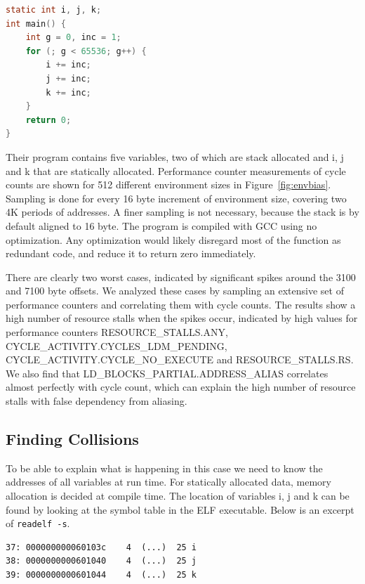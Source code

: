 \documentclass[a4paper,10pt,twocolumn,twoside]{article}
\begin{document}
\begin{lstlisting}[float=h, language=C, caption={Microkernel succeptible to aliasing between static variables and automatic variables for certain environment sizes}, label={lst:loopkernel}, frame=lines]
static int i, j, k;
int main() {
    int g = 0, inc = 1;
    for (; g < 65536; g++) {
        i += inc;
        j += inc;
        k += inc; 
    }
    return 0;
}
\end{lstlisting}

Their program contains five variables, two of which are stack allocated and i, j and k that are statically allocated.
Performance counter measurements of cycle counts are shown for 512 different environment sizes in Figure~\ref{fig:envbias}.
Sampling is done for every 16 byte increment of environment size, covering two 4K periods of addresses.
A finer sampling is not necessary, because the stack is by default aligned to 16 byte.
The program is compiled with GCC using no optimization.
Any optimization would likely disregard most of the function as redundant code, and reduce it to return zero immediately.

There are clearly two worst cases, indicated by significant spikes around the 3100 and 7100 byte offsets.
We analyzed these cases by sampling an extensive set of performance counters and correlating them with cycle counts.
The results show a high number of resource stalls when the spikes occur, indicated by high values for performance counters \small{RESOURCE\_STALLS.ANY}, \small{CYCLE\_ACTIVITY.CYCLES\_LDM\_PENDING}, \small{CYCLE\_ACTIVITY.CYCLE\_NO\_EXECUTE} and \small{RESOURCE\_STALLS.RS}.
We also find that \small{LD\_BLOCKS\_PARTIAL.ADDRESS\_ALIAS} correlates almost perfectly with cycle count, which can explain the high number of resource stalls with false dependency from aliasing.

\subsection{Finding Collisions}
To be able to explain what is happening in this case we need to know the addresses of all variables at run time.
For statically allocated data, memory allocation is decided at compile time.
The location of variables i, j and k can be found by looking at the symbol table in the ELF executable.
Below is an excerpt of \lstinline$readelf -s$.
\begin{lstlisting}[float=h, basicstyle=\small]
37: 000000000060103c    4  (...)  25 i
38: 0000000000601040    4  (...)  25 j
39: 0000000000601044    4  (...)  25 k
\end{lstlisting}
\end{document}

